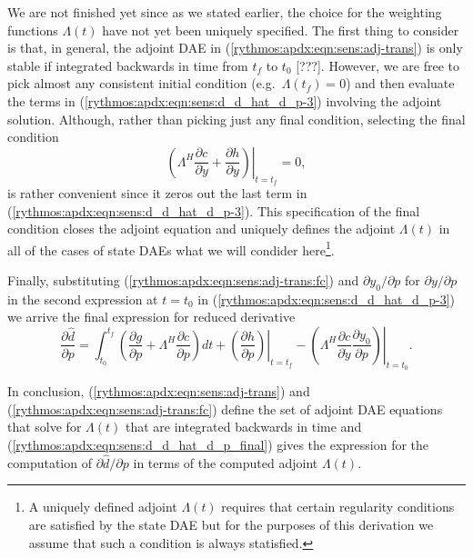 \documentclass[pdf,ps2pdf,11pt]{SANDreport}
\begin{document}
%
We are not finished yet since as we stated earlier, the choice for the
weighting functions $\Lambda(t)$ have not yet been uniquely specified.
The first thing to consider is that, in general, the adjoint DAE in
(\ref{rythmos:apdx:eqn:sens:adj-trans}) is only stable if integrated
backwards in time from $t_f$ to $t_0$ [???].  However, we are free to
pick almost any consistent initial condition (e.g.\ $\Lambda(t_f)=0$)
and then evaluate the terms in
(\ref{rythmos:apdx:eqn:sens:d_d_hat_d_p-3}) involving the adjoint
solution.  Although, rather than picking just any final condition,
selecting the final condition
%
\begin{equation}
\left. \left(
  \Lambda^H \frac{\partial c}{\partial \dot{y}}
  +  \frac{\partial h}{\partial y}
\right) \right|_{t=t_f}
 = 0,
\label{rythmos:apdx:eqn:sens:adj-trans:fc}
\end{equation}
%
is rather convenient since it zeros out the last term in
(\ref{rythmos:apdx:eqn:sens:d_d_hat_d_p-3}).  This specification of
the final condition closes the adjoint equation and uniquely defines
the adjoint $\Lambda(t)$ in all of the cases of state DAEs what we
will condider here\footnote{A uniquely defined adjoint $\Lambda(t)$
requires that certain regularity conditions are satisfied by the state
DAE but for the purposes of this derivation we assume that such a
condition is always statisfied.}.

Finally, substituting (\ref{rythmos:apdx:eqn:sens:adj-trans:fc}) and
$\partial y_0 / {}\partial p$ for $\partial y / {}\partial p$ in the
second expression at $t=t_0$ in
(\ref{rythmos:apdx:eqn:sens:d_d_hat_d_p-3}) we arrive the final
expression for reduced derivative
%
%
\begin{equation}
\frac{\partial \hat{d}}{\partial p} =
\int_{t_0}^{t_f} \left(
    \frac{\partial g}{\partial p}
    + \Lambda^H \frac{\partial c}{\partial p}
  \right) dt
  + \left. \left( \frac{\partial h}{\partial p} \right) \right|_{t=t_f}
  - \left. \left( \Lambda^H \frac{\partial c}{\partial \dot{y}} \frac{\partial y_0}{\partial p} \right) \right|_{t=t_0}.
\label{rythmos:apdx:eqn:sens:d_d_hat_d_p_final}
\end{equation}

In conclusion, (\ref{rythmos:apdx:eqn:sens:adj-trans}) and
(\ref{rythmos:apdx:eqn:sens:adj-trans:fc}) define the set of adjoint DAE
equations that solve for $\Lambda(t)$ that are integrated backwards in time
and (\ref{rythmos:apdx:eqn:sens:d_d_hat_d_p_final}) gives the expression for
the computation of $\partial {}\hat{d} / {}\partial p$ in terms of the
computed adjoint $\Lambda(t)$.
\end{document}
